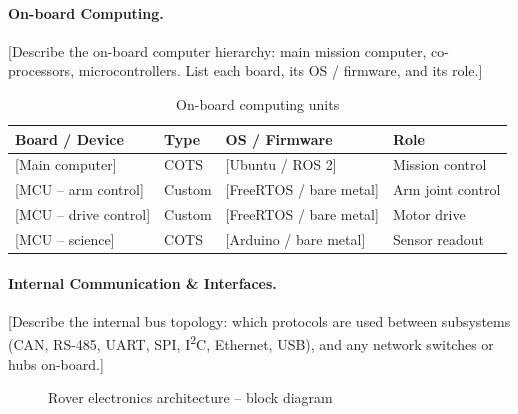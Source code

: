 \paragraph{On-board Computing.}
[Describe the on-board computer hierarchy: main mission computer, co-processors,
microcontrollers. List each board, its OS / firmware, and its role.]

\begin{table}[H]
    \centering
    \caption{On-board computing units}
    \label{tab:computing}
    \begin{tabular}{L{3.5cm} L{2cm} L{2.5cm} L{4cm}}
        \toprule
        \textbf{Board / Device} & \textbf{Type} & \textbf{OS / Firmware} & \textbf{Role} \\
        \midrule
        {[Main computer]}         & COTS & [Ubuntu / ROS 2] & Mission control \\
        {[MCU -- arm control]}    & Custom & [FreeRTOS / bare metal] & Arm joint control \\
        {[MCU -- drive control]}  & Custom & [FreeRTOS / bare metal] & Motor drive \\
        {[MCU -- science]}        & COTS & [Arduino / bare metal]  & Sensor readout \\
        \bottomrule
    \end{tabular}
\end{table}

\paragraph{Internal Communication \& Interfaces.}
[Describe the internal bus topology: which protocols are used between
subsystems (CAN, RS-485, UART, SPI, I\textsuperscript{2}C, Ethernet, USB),
and any network switches or hubs on-board.]

\begin{figure}[H]
    \centering
    \caption{Rover electronics architecture -- block diagram}
    \label{fig:elec_arch}
\end{figure}

